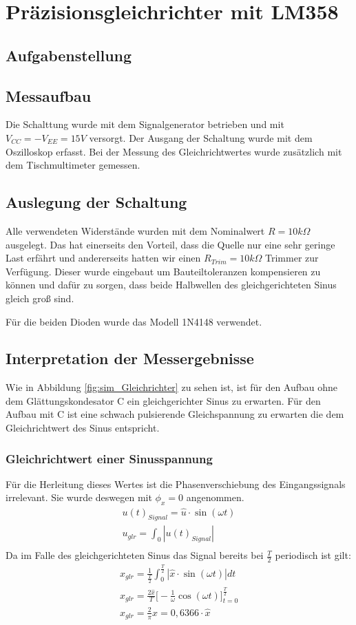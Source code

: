 \section{Präzisionsgleichrichter mit LM358}
\subsection{Aufgabenstellung}

\subsection{Messaufbau}
Die Schalttung wurde mit dem Signalgenerator betrieben und mit $V_{CC} = -V_{EE} = 15V$ versorgt. Der Ausgang der Schaltung wurde mit dem Oszilloskop erfasst. Bei der Messung des Gleichrichtwertes wurde zusätzlich mit dem Tischmultimeter gemessen.
\subsection{Auslegung der Schaltung}
Alle verwendeten Widerstände wurden mit dem Nominalwert $R=10k\Omega$ ausgelegt. Das hat einerseits den Vorteil, dass die Quelle nur eine sehr geringe Last erfährt und andererseits hatten wir einen $R_{Trim} = 10k\Omega$ Trimmer zur Verfügung. Dieser wurde eingebaut um Bauteiltoleranzen kompensieren zu können und dafür zu sorgen, dass beide Halbwellen des gleichgerichteten Sinus gleich groß sind.

Für die beiden Dioden wurde das Modell 1N4148 verwendet.
\subsection{Interpretation der Messergebnisse}
Wie in Abbildung \ref{fig:sim_Gleichrichter} zu sehen ist, ist für den Aufbau ohne dem Glättungskondesator C ein gleichgerichter Sinus zu erwarten. Für den Aufbau mit C ist eine schwach pulsierende Gleichspannung zu erwarten die dem Gleichrichtwert des Sinus entspricht.
\subsubsection{Gleichrichtwert einer Sinusspannung}
Für die Herleitung dieses Wertes ist die Phasenverschiebung des Eingangssignals irrelevant. Sie wurde deswegen mit $\phi_x = 0$ angenommen. 
\begin{align}
    u(t)_{Signal} =  \hat{u} \cdot \sin(\omega t) \\   
    u_{glr} = \int_{0}{|u(t)_{Signal}|} \\
\end{align}
Da im Falle des gleichgerichteten Sinus das Signal bereits bei $\frac{T}{2}$ periodisch ist gilt:
\begin{align}
x_{glr} = \frac{1}{\frac{T}{2}}\int _{0} ^{\frac{T}{2}} |\hat{x} \cdot \sin{(\omega t)}|dt\\
x_{glr} = \frac{2\hat{x}}{T} \bigl\lbrack -\frac{1}{\omega}\cos{(\omega t)} \bigr\rbrack ^{\frac{T}{2}} _{t=0} \\
x_{glr} = \frac{2}{\pi} \hat{x} = 0,6366\cdot \hat{x}
\end{align}

